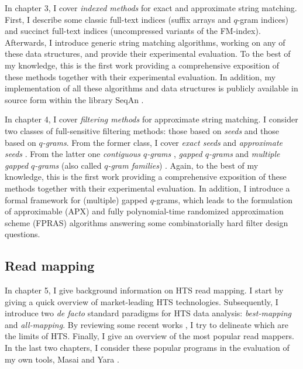 In chapter 3, I cover \emph{indexed methods} for exact and approximate string matching.
First, I describe some classic full-text indices (suffix arrays and $q$-gram indices) and succinct full-text indices (uncompressed variants of the FM-index).
Afterwards, I introduce generic string matching algorithms, working on any of these data structures, and provide their experimental evaluation.
To the best of my knowledge, this is the first work providing a comprehensive exposition of these methods together with their experimental evaluation.
In addition, my implementation of all these algorithms and data structures is publicly available in source form within the \CC library SeqAn \citep{Doering2008}.

In chapter 4, I cover \emph{filtering methods} for approximate string matching.
I consider two classes of full-sensitive filtering methods: those based on \emph{seeds} and those based on \emph{$q$-grams}.
From the former class, I cover
\emph{exact seeds} \citep{Baeza1992} and
\emph{approximate seeds} \citep{Myers1994,Navarro2000}.
From the latter one
\emph{contiguous $q$-grams} \citep{Jokinen1991},
\emph{gapped $q$-grams} \citep{Burkhardt2001} and
\emph{multiple gapped $q$-grams} (also called \emph{$q$-gram families}) \citep{Kucherov2005}.
Again, to the best of my knowledge, this is the first work providing a comprehensive exposition of these methods together with their experimental evaluation.
In addition, I introduce a formal framework for (multiple) gapped $q$-grams, which leads to the formulation of approximable (APX) and fully polynomial-time randomized approximation scheme (FPRAS) algorithms answering some combinatorially hard filter design questions.

\subsection{Read mapping}

In chapter 5, I give background information on HTS read mapping.
I start by giving a quick overview of market-leading HTS technologies.
Subsequently, I introduce two \emph{de facto} standard paradigms for HTS data analysis: \emph{best-mapping} and \emph{all-mapping}.
By reviewing some recent works \citep{Derrien2012,Lee2012}, I try to delineate which are the limits of HTS.
Finally, I give an overview of the most popular read mappers.
In the last two chapters, I consider these popular programs in the evaluation of my own tools, Masai \citep{Siragusa2013} and Yara \citep{Siragusa2015}.

